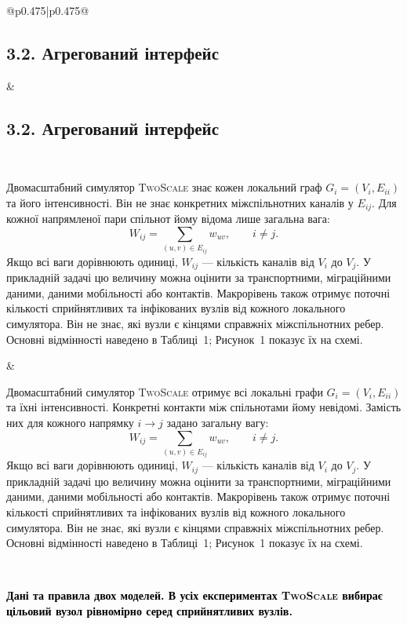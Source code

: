 ﻿\documentclass[11pt]{article}
\newcommand{\TS}{\textup{\textsc{TwoScale}}}
\begin{document}
\begin{longtable}{@{}p{0.475\textwidth}|p{0.475\textwidth}@{}}
\begin{minipage}[t]{\linewidth}
\subsection*{3.2. Агрегований інтерфейс}
\end{minipage} &
\begin{minipage}[t]{\linewidth}
\subsection*{3.2. Агрегований інтерфейс}
\end{minipage} \\[5mm]
\begin{minipage}[t]{\linewidth}
Двомасштабний симулятор \TS{} знає кожен локальний граф $G_i=(V_i,E_{ii})$ та його інтенсивності. Він не знає конкретних міжспільнотних каналів у $E_{ij}$. Для кожної напрямленої пари спільнот йому відома лише загальна вага:
\begin{equation*}W_{ij}=\sum_{(u,v)\in E_{ij}}w_{uv},\qquad i\neq j.\tag{3}
\end{equation*}
Якщо всі ваги дорівнюють одиниці, $W_{ij}$ --- кількість каналів від $V_i$ до $V_j$. У прикладній задачі цю величину можна оцінити за транспортними, міграційними даними, даними мобільності або контактів. Макрорівень також отримує поточні кількості сприйнятливих та інфікованих вузлів від кожного локального симулятора. Він не знає, які вузли є кінцями справжніх міжспільнотних ребер. Основні відмінності наведено в Таблиці~1; Рисунок~1 показує їх на схемі.
\end{minipage} &
\begin{minipage}[t]{\linewidth}
Двомасштабний симулятор \TS{} отримує всі локальні графи $G_i=(V_i,E_{ii})$ та їхні інтенсивності. Конкретні контакти між спільнотами йому невідомі. Замість них для кожного напрямку $i\to j$ задано загальну вагу:
\begin{equation*}W_{ij}=\sum_{(u,v)\in E_{ij}}w_{uv},\qquad i\neq j.\tag{3}
\end{equation*}
Якщо всі ваги дорівнюють одиниці, $W_{ij}$ --- кількість каналів від $V_i$ до $V_j$. У прикладній задачі цю величину можна оцінити за транспортними, міграційними даними, даними мобільності або контактів. Макрорівень також отримує поточні кількості сприйнятливих та інфікованих вузлів від кожного локального симулятора. Він не знає, які вузли є кінцями справжніх міжспільнотних ребер. Основні відмінності наведено в Таблиці~1; Рисунок~1 показує їх на схемі.
\end{minipage} \\[5mm]
\begin{minipage}[t]{\linewidth}
\par\noindent\begin{minipage}{\linewidth}
\color{black}\centering
\par\small\textbf{\textcolor{black}{Дані та правила двох моделей. В усіх експериментах \TS{} вибирає цільовий вузол рівномірно серед сприйнятливих вузлів.}}


\end{minipage}
\end{minipage}
\end{longtable}
\end{document}
